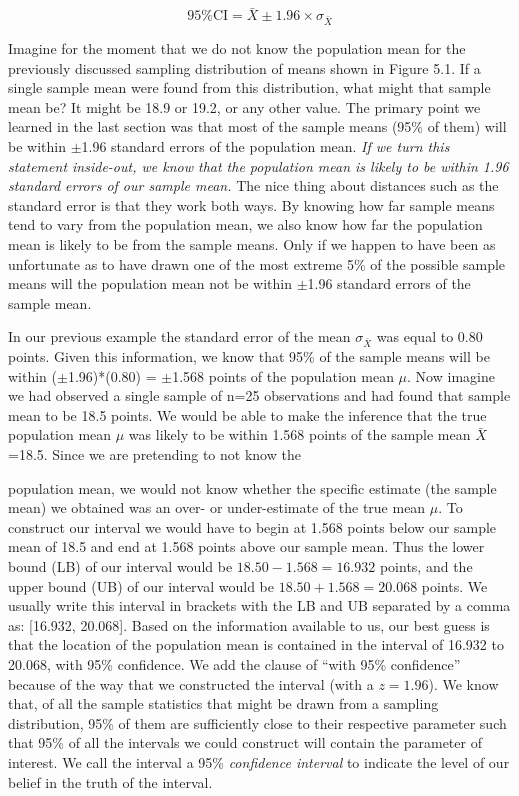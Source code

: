 \documentclass[12pt]{article}
\begin{document}
\begin{equation}
95\%\text{CI} = \bar{X} \pm 1.96 \times \sigma_{\bar{X}} \tag{5.2}
\end{equation}

Imagine for the moment that we do not know the population mean for the
previously discussed sampling distribution of means shown in Figure 5.1. If a single sample
mean were found from this distribution, what might that sample mean be? It might be 18.9
or 19.2, or any other value. The primary point we learned in the last section was that most
of the sample means (95\% of them) will be within $\pm$1.96 standard errors of the population
mean. \textit{If we turn this statement inside-out, we know that the population mean is likely to be
within 1.96 standard errors of our sample mean.} The nice thing about distances such as the
standard error is that they work both ways. By knowing how far sample means tend to
vary from the population mean, we also know how far the population mean is likely to be
from the sample means. Only if we happen to have been as unfortunate as to have drawn
one of the most extreme 5\% of the possible sample means will the population mean not be
within $\pm$1.96 standard errors of the sample mean.

In our previous example the standard error of the mean $\sigma_{\bar{X}}$ was equal to 0.80 points.
Given this information, we know that 95\% of the sample means will be within
($\pm$1.96)*(0.80) = $\pm$1.568 points of the population mean $\mu$. Now imagine we had observed a
single sample of n=25 observations and had found that sample mean to be 18.5 points. We
would be able to make the inference that the true population mean $\mu$ was likely to be
within 1.568 points of the sample mean $\bar{X}$=18.5. Since we are pretending to not know the

\newpage


population mean, we would not know whether the specific estimate (the sample mean) we
obtained was an over- or under-estimate of the true mean $\mu$. To construct our interval we
would have to begin at 1.568 points below our sample mean of 18.5 and end at 1.568
points above our sample mean. Thus the lower bound (LB) of our interval would be $18.50 -
1.568 = 16.932$ points, and the upper bound (UB) of our interval would be $18.50 + 1.568 =
20.068$ points. We usually write this interval in brackets with the LB and UB separated by a
comma as: [16.932, 20.068]. Based on the information available to us, our best guess is that
the location of the population mean is contained in the interval of 16.932 to 20.068, with
95\% confidence. We add the clause of ``with 95\% confidence'' because of the way that we
constructed the interval (with a $z = 1.96$). We know that, of all the sample statistics that
might be drawn from a sampling distribution, 95\% of them are sufficiently close to their
respective parameter such that 95\% of all the intervals we could construct will contain the
parameter of interest. We call the interval a 95\% \textit{confidence interval} to indicate the level of
our belief in the truth of the interval.
\end{document}

